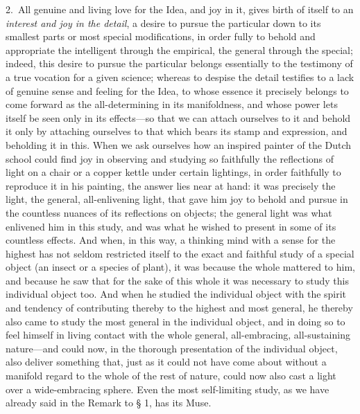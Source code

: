 \documentclass[12pt,a4paper]{book}
\begin{document}
2.~All genuine and living love for the Idea, and joy in it, gives birth of itself to an
\emph{interest and joy in the detail}, a desire to pursue the particular down to its
smallest parts or most special modifications, in order fully to behold and appropriate the
intelligent through the empirical, the general through the special; indeed, this desire to
pursue the particular belongs essentially to the testimony of a true vocation for a given
science; whereas to despise the detail testifies to a lack of genuine sense and feeling for
the Idea, to whose essence it precisely belongs to come forward as the all-determining in
its manifoldness, and whose power lets itself be seen only in its effects---so that we can
attach ourselves to it and behold it only by attaching ourselves to that which bears its
stamp and expression, and beholding it in this. When we ask ourselves how an inspired
painter of the Dutch school could find joy in observing and studying so faithfully the
reflections of light on a chair or a copper kettle under certain lightings, in order
faithfully to reproduce it in his painting, the answer lies near at hand: it was precisely
the light, the general, all-enlivening light, that gave him joy to behold and pursue in the
countless nuances of its reflections on objects; the general light was what enlivened him in
this study, and was what he wished to present in some of its countless effects. And when, in
this way, a thinking mind with a sense for the highest has not seldom restricted itself to
the exact and faithful study of a special object (an insect or a species of plant), it was
because the whole mattered to him, and because he saw that for the sake of this whole it was
necessary to study this individual object too. And when he studied the individual object
with the spirit and tendency of contributing thereby to the highest and most general, he
thereby also came to study the most general in the individual object, and in doing so to
feel himself in living contact with the whole general, all-embracing, all-sustaining
nature---and could now, in the thorough presentation of the individual object, also deliver
something that, just as it could not have come about without a manifold regard to the whole
of the rest of nature, could now also cast a light over a wide-embracing sphere. Even the
most self-limiting study, as we have already said in the Remark to § 1, has its Muse.
\end{document}
